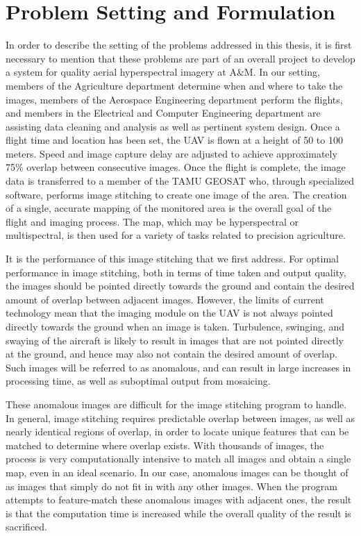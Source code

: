 \section{Problem Setting and Formulation}

In order to describe the setting of the problems addressed in this thesis, it is first necessary to mention that these problems are part of an overall project to develop a system for quality aerial hyperspectral imagery at A\&M.
In our setting, members of the Agriculture department determine when and where to take the images, members of the Aerospace Engineering department perform the flights, and members in the Electrical and Computer Engineering department are assisting data cleaning and analysis as well as pertinent system design.
Once a flight time and location has been set, the UAV is flown at a height of 50 to 100 meters.
Speed and image capture delay are adjusted to achieve approximately 75\% overlap between consecutive images.
Once the flight is complete, the image data is transferred to a member of the TAMU GEOSAT who, through specialized software, performs image stitching to create one image of the area.
The creation of a single, accurate mapping of the monitored area is the overall goal of the flight and imaging process.
The map, which may be hyperspectral or multispectral, is then used for a variety of tasks related to precision agriculture.

It is the performance of this image stitching that we first address.
For optimal performance in image stitching, both in terms of time taken and output quality, the images should be pointed directly towards the ground and contain the desired amount of overlap between adjacent images.
However, the limits of current technology mean that the imaging module on the UAV is not always pointed directly towards the ground when an image is taken.
Turbulence, swinging, and swaying of the aircraft is likely to result in images that are not pointed directly at the ground, and hence may also not contain the desired amount of overlap.
Such images will be referred to as anomalous, and can result in large increases in processing time, as well as suboptimal output from mosaicing.

These anomalous images are difficult for the image stitching program to handle.
In general, image stitching requires predictable overlap between images, as well as nearly identical regions of overlap, in order to locate unique features that can be matched to determine where overlap exists.
With thousands of images, the process is very computationally intensive to match all images and obtain a single map, even in an ideal scenario.
In our case, anomalous images can be thought of as images that simply do not fit in with any other images.
When the program attempts to feature-match these anomalous images with adjacent ones, the result is that the computation time is increased while the overall quality of the result is sacrificed.

